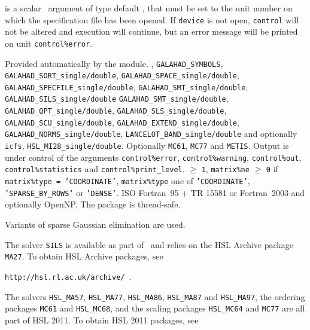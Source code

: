 \documentclass{galahad}
\begin{document}
\begin{description}

 is a scalar \intentin\ argument of type default \integer,
that must be set to the unit number on which the specification file
has been opened. If {\tt device} is not open, {\tt control} will
not be altered and execution will continue, but an error message
will be printed on unit {\tt control\%error}.

\end{description}


\galgeneral

\galworkspace Provided automatically by the module.
,
{\tt GALAHAD\_SYMBOLS},
{\tt GALAHAD\_SORT\_single/double},
{\tt GALAHAD\_SPACE\-\_single/double},
{\tt GALAHAD\_SPECFILE\_single/double},
{\tt GALAHAD\_SMT\-\_sin\-gle/double},
{\tt GALAHAD\_SILS\_single/double}
{\tt GALAHAD\_SMT\_single/double},
{\tt GALAHAD\_QPT\_single/double},
{\tt GALAHAD\_SLS\_single/double},
{\tt GALAHAD\_SCU\_single/double},
{\tt GALAHAD\_EXTEND\_single/double},
{\tt GALAHAD\_NORMS\_single/double},
{\tt LANCELOT\_BAND\_single/double}
and optionally
{\tt icfs},
{\tt HSL\_\-MI28\_single/double}.
\galroutines Optionally {\tt MC61}, {\tt MC77} and {\tt METIS}.
\galio Output is under control of the arguments
{\tt control\%error},
{\tt control\%warning},
{\tt control\%out}, \\
{\tt control\-\%statistics}
and {\tt control\%print\_level}.
 $\geq$ {\tt 1},
{\tt matrix\%ne} $\geq$ {\tt 0} if
{\tt matrix\%type = 'COORDINATE'},
{\tt matrix\%type}
one of
{\tt 'COORDINATE'}, {\tt 'SPARSE\_BY\_ROWS'} or   {\tt 'DENSE'}.
\galportability ISO Fortran~95 + TR 15581 or Fortran~2003 and optionally OpenNP.
The package is thread-safe.


\galmethod
Variants of sparse Gaussian elimination are used.

\noindent
The solver {\tt SILS} is available as part of \galahad\ and relies on
the HSL Archive package {\tt MA27}. To obtain HSL Archive packages, see

{\tt http://hsl.rl.ac.uk/archive/ }.

\noindent
The solvers
{\tt HSL\_MA57},
{\tt HSL\_MA77},
{\tt HSL\_MA86},
{\tt HSL\_MA87}
and
{\tt HSL\_MA97}, the ordering packages
{\tt MC61} and {\tt HSL\_MC68}, and the scaling packages
{\tt HSL\_MC64} and {\tt MC77}
are all part of HSL 2011.
To obtain HSL 2011 packages, see
\end{document}
